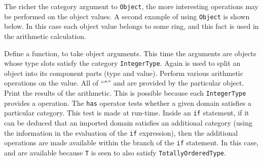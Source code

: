 \vspace{1cm}
The richer the category argument to \verb"Object", the more interesting
operations may be performed on the object values.  A second example
of using \verb"Object" is shown below.  In this case each object
value belongs to some ring, and this fact is used in the arithmetic
calculation.
\begin{description}
   Define a function,  to take object arguments.
   This time the arguments are objects whose type slots satisfy the
   category \verb"IntegerType".
   Again  is used to split an object into its component parts
   (type and value).
   Perform various arithmetic operations on the value.
   All of \ttin{+} \ttin{-} \ttin{*} ``\verb"^"'' and  are provided
   by the particular object.
   Print the results of the arithmetic.  This is possible because each
   \verb"IntegerType" provides a \ttin{<<} operation.
   The {\tt has} operator tests whether a given domain
   satisfies a particular category. This test is made at run-time.
   Inside an {\tt if} statement, if it can be deduced that
   an imported domain satisfies an additional category
   (using the information in the evaluation of the {\tt if} expression),
   then the additional operations are made available within the 
   branch of the {\tt if} statement. 
   In this case, \ttin{<} and \ttin{>} are available because \verb"T" 
   is seen to also satisfy \verb"TotallyOrderedType".
\end{description}

